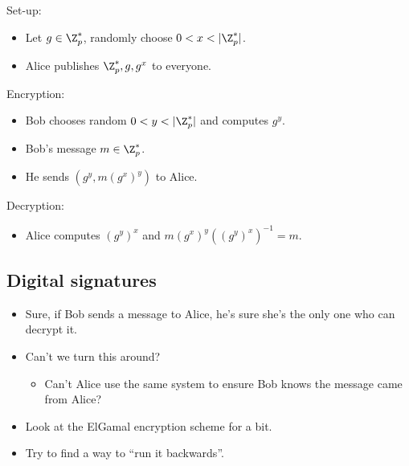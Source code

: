 \begin{frame}
  \begin{definition}
    Set-up:
    \begin{itemize}
      \item Let \(g\in \Z_p^*\), randomly choose \(0 < x < |\Z_p^*|\).
      \item Alice publishes \(\Z_p^*, g, g^x\) to everyone.
    \end{itemize}
    Encryption:
    \begin{itemize}
      \item Bob chooses random \(0 < y < |\Z_p^*|\) and computes \(g^y\).
      \item Bob's message \(m\in \Z_p^*\).
      \item He sends \((g^y, m(g^{x})^y)\) to Alice.
    \end{itemize}
    Decryption:
    \begin{itemize}
      \item Alice computes \((g^y)^x\) and \(m(g^x)^y((g^{y})^x)^{-1} = m\).
    \end{itemize}
  \end{definition}
\end{frame}

\subsection{Digital signatures}

\begin{frame}
  \begin{idea}
    \begin{itemize}
      \item Sure, if Bob sends a message to Alice, he's sure she's the only one
        who can decrypt it.

        \pause{}

      \item Can't we turn this around?
        \begin{itemize}
          \item Can't Alice use the same system to ensure Bob knows the message
            came from Alice?
        \end{itemize}
    \end{itemize}
  \end{idea}

  \pause{}

  \begin{exercise}
    \begin{itemize}
      \item Look at the ElGamal encryption scheme for a bit.
      \item Try to find a way to \enquote{run it backwards}.
    \end{itemize}
  \end{exercise}
\end{frame}

